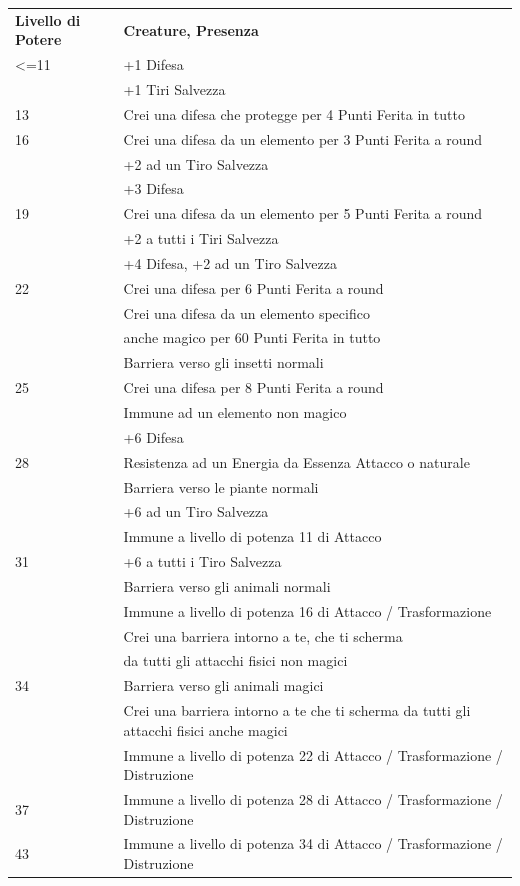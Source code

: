 \documentclass[a4paper,10 pt,twoside,openany]{book}
\begin{document}
\bigskip
\begin{tabularx}{0.95\textwidth}{lX}
	\toprule
	\textbf{Livello di Potere} & \textbf{Creature, Presenza}\\
	<=11     & +1 Difesa  \\
	& +1 Tiri Salvezza \\
	13       & Crei una difesa che protegge per 4 Punti Ferita in tutto \\
	16       & Crei una difesa da un elemento per 3 Punti Ferita a round\\
	& +2 ad un Tiro Salvezza\\
	& +3 Difesa\\
	19       & Crei una difesa da un elemento per 5 Punti Ferita a round\\
	& +2 a tutti i Tiri Salvezza   \\
	& +4 Difesa, +2 ad un Tiro Salvezza \\
	22       & Crei una difesa per 6 Punti Ferita a round \\
	& Crei una difesa da un elemento specifico \\
	& anche magico per 60 Punti Ferita in tutto \\
	& Barriera verso gli insetti normali \\
	25       & Crei una difesa per 8 Punti Ferita a round \\
	& Immune ad un elemento non magico \\
	& +6 Difesa \\
	28       & Resistenza ad un Energia da Essenza Attacco o naturale \\
	& Barriera verso le piante normali\\
	& +6 ad un Tiro Salvezza\\
	& Immune a livello di potenza 11 di Attacco\\
	31       & +6 a tutti i Tiro Salvezza\\
	& Barriera verso gli animali normali\\
	& Immune a livello di potenza 16 di Attacco / Trasformazione\\
	& Crei una barriera intorno a te, che ti scherma\\
	& da tutti gli attacchi fisici non magici\\
	34       & Barriera verso gli animali magici\\
	& Crei una barriera intorno a te che ti scherma da tutti gli attacchi fisici anche magici\\
	& Immune a livello di potenza 22 di Attacco / Trasformazione / Distruzione \\
	37       & Immune a livello di potenza 28 di Attacco / Trasformazione / Distruzione \\
	43       & Immune a livello di potenza 34 di Attacco / Trasformazione / Distruzione \\
\end{tabularx}
\end{document}
